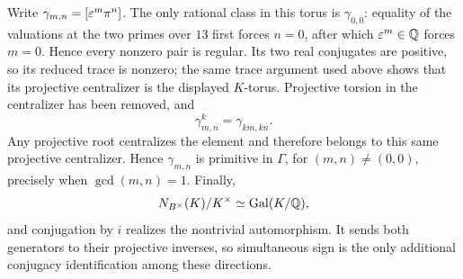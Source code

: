 Write $\gamma_{m,n}=[\varepsilon^m\pi^n]$.  The only rational class in this torus
is $\gamma_{0,0}$: equality of the valuations at the two primes over $13$
first forces $n=0$, after which $\varepsilon^m\in\mathbb{Q}$ forces $m=0$.  Hence every
nonzero pair is regular.  Its two real conjugates are positive, so its
reduced trace is nonzero; the same trace argument used above shows that its
projective centralizer is the displayed $K$-torus.  Projective torsion in the
centralizer has been removed, and
\[
\gamma_{m,n}^k=\gamma_{km,kn}.
\]
Any projective root centralizes the element and therefore belongs to this
same projective centralizer.  Hence $\gamma_{m,n}$ is
primitive in $\Gamma$, for $(m,n)\ne(0,0)$, precisely when
$\gcd(m,n)=1$.  Finally,
\[
N_{B^\times}(K)/K^\times\simeq\operatorname{Gal}(K/\mathbb{Q}),
\]
and conjugation by $i$ realizes the nontrivial automorphism.  It sends both
generators to their projective inverses, so simultaneous sign is the only
additional conjugacy identification among these directions.
